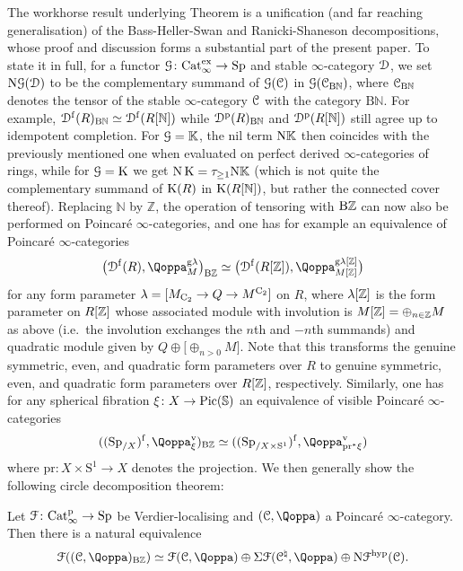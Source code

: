 The workhorse result underlying Theorem  is a unification (and far reaching generalisation) of the Bass-Heller-Swan and Ranicki-Shaneson decompositions, whose proof and discussion forms a substantial part of the present paper. To state it in full, for a functor $\mathcal{G} \colon \mathrm{Cat}_\infty^{\mathrm{ex}} \rightarrow \mathrm{Sp}$ and stable $\infty$-category $\mathcal{D}$, we set 
$\mathrm N\mathcal G(\mathcal{D})$ to be the complementary summand of $\mathcal{G}(\mathcal C)$ in $\mathcal{G}(\mathcal C_{\mathrm B\mathbb N})$, where $\mathcal C_{\mathrm{B}\mathbb{N}}$ denotes the tensor of the stable $\infty$-category $\mathcal C$ with the category $\mathrm{B}\mathbb{N}$.
For example, ${\mathcal D}^{\mathrm{f}}(R)_{\mathrm{B}\mathbb{N}} \simeq {\mathcal D}^{\mathrm{f}}(R[\mathbb{N}])$ while ${\mathcal D}^{\mathrm{p}}(R)_{\mathrm{B}\mathbb{N}}$ and ${\mathcal D}^{\mathrm{p}}(R[\mathbb{N}])$ still agree up to idempotent completion.
For $\mathcal{G} = \mathbb K$, the nil term $\mathrm{N}\mathbb K$ then coincides with the previously mentioned one when evaluated on perfect derived $\infty$-categories of rings, while for $\mathcal{G}=\operatorname K$ we get $\mathrm{N}\operatorname K = \tau_{\geq 1} \mathrm{N}\mathbb K$ (which is not quite the complementary summand of $\operatorname K(R)$ in $\operatorname K(R[\mathbb{N}])$, but rather the connected cover thereof). %
Replacing $\mathbb N$ by $\mathbb Z$, the operation of tensoring with $\mathrm{B}\mathbb{Z}$ can now also be performed on Poincaré $\infty$-categories, and one has for example an equivalence of Poincar\'e $\infty$-categories
\[
\big(\Dfree(R),\QF_M^{\mathrm{g}\lambda}\big)_{\mathrm{B}\mathbb Z}  \simeq \big(\Dfree(R[\ZZ]),\QF_{M[\ZZ]}^{\g\lambda[\ZZ]}\big)
\]
for any form parameter $\lambda=[M_{\mathrm{C_2}} \to Q \to M^{\mathrm{C_2}}]$ on $R$, where $\lambda[\mathbb{Z}]$ is the form parameter on $R[\mathbb{Z}]$ whose associated module with involution is $M[\mathbb{Z}] = \oplus_{n \in \mathbb{Z}}M$ as above (i.e.\ the involution exchanges the $n$th and $-n$th summands) and quadratic module given by $Q \oplus \big[\oplus_{n > 0}M\big]$. Note that this transforms the genuine symmetric, even, and quadratic form parameters over $R$ to genuine symmetric, even, and quadratic form parameters over $R[\mathbb{Z}]$, respectively. Similarly, one has for any spherical fibration $\xi \colon X \to \operatorname{Pic}(\mathbb{S})$ an equivalence of visible Poincar\'e $\infty$-categories
\[
((\Sp_{/X})^\mathrm{f},\QF^\vis_\xi)_{\mathrm B \mathbb Z} \simeq ((\Sp_{/X \times \mathrm S^1})^\mathrm{f},\QF_{\mathrm{pr}^\ast\xi}^{\vis})
\]
where $\mathrm{pr} \colon X \times \mathrm S^1 \to X$ denotes the projection.
We then generally show the following circle decomposition theorem:

\begin{theoremintrofour}
\label{theorem:intro-F}%
Let $\mathcal F \colon \mathrm{Cat}^{\mathrm p}_\infty \rightarrow \mathrm{Sp}$ be Verdier-localising and $(\C,\QF)$ a Poincaré $\infty$-category. Then there is a natural equivalence
\[
\F((\C,\QF)_{\mathrm B\mathbb Z}) \simeq \F(\C,\QF) \oplus \Sigma \mathcal F(\C^\natural,\QF) \oplus \mathrm N\F^\hyp(\C).
\]
\end{theoremintrofour}


